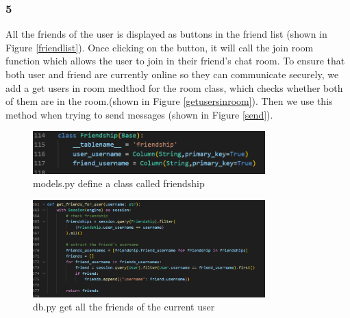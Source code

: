 \documentclass[12pt]{article}
\begin{document}
        \subsubsection*{5} 

        All the friends of the user is displayed as buttons in the friend list (shown in Figure \ref{friendlist}).  Once clicking on the button, it will call the join room function which allows the user to join in their friend's chat room.  To ensure that both user and friend are currently online so they can communicate securely, we add a get users in room medthod for the room class, which checks whether both of them are in the room.(shown in Figure \ref{getusersinroom}). Then we use this method when trying to send messages (shown in Figure \ref{send}).

        \begin{figure}[H]
            \centering
            \includegraphics[width=0.8\textwidth]{zzrgraphs/models_friendship.png}
            \caption{models.py define a class called friendship}
            \label{friendshipClass}
        \end{figure}

        \begin{figure}[H]
                \centering
                \includegraphics[width=0.8\textwidth]{zzrgraphs/db_getfriendforuser.png}
                \caption{db.py get all the friends of the current user}
                \label{getfriends}
            \end{figure}
\end{document}
